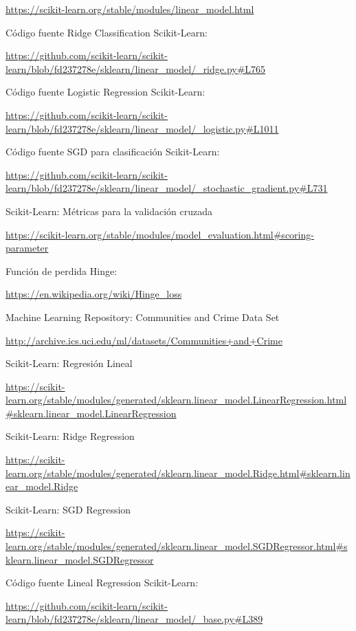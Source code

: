 \documentclass[12pt, spanish]{article}
\begin{document}
\begin{thebibliography}{9}
\url{https://scikit-learn.org/stable/modules/linear_model.html}


Código fuente Ridge Classification Scikit-Learn:

\url{https://github.com/scikit-learn/scikit-learn/blob/fd237278e/sklearn/linear_model/_ridge.py#L765}



Código fuente Logistic Regression Scikit-Learn:

\url{https://github.com/scikit-learn/scikit-learn/blob/fd237278e/sklearn/linear_model/_logistic.py#L1011}



Código fuente SGD para clasificación Scikit-Learn:

\url{https://github.com/scikit-learn/scikit-learn/blob/fd237278e/sklearn/linear_model/_stochastic_gradient.py#L731}



Scikit-Learn: Métricas para la validación cruzada

\url{https://scikit-learn.org/stable/modules/model_evaluation.html#scoring-parameter}


Función de perdida Hinge:

\url{https://en.wikipedia.org/wiki/Hinge_loss}


Machine Learning Repository: Communities and Crime Data Set  

\url{http://archive.ics.uci.edu/ml/datasets/Communities+and+Crime}


Scikit-Learn: Regresión Lineal

\url{https://scikit-learn.org/stable/modules/generated/sklearn.linear_model.LinearRegression.html#sklearn.linear_model.LinearRegression}

Scikit-Learn: Ridge Regression

\url{https://scikit-learn.org/stable/modules/generated/sklearn.linear_model.Ridge.html#sklearn.linear_model.Ridge}

Scikit-Learn: SGD Regression

\url{https://scikit-learn.org/stable/modules/generated/sklearn.linear_model.SGDRegressor.html#sklearn.linear_model.SGDRegressor}


Código fuente Lineal Regression Scikit-Learn:

\url{https://github.com/scikit-learn/scikit-learn/blob/fd237278e/sklearn/linear_model/_base.py#L389}


\end{thebibliography}
\end{document}
